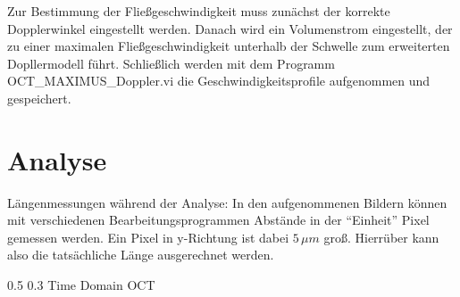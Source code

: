 \documentclass[german, %
parskip=full, %
bibliography=totoc, %
]{scrartcl}
\makeatletter
\renewcommand\subsection{\@startsection 
   {subsection}{2}{0mm}%
   {0.5\baselineskip}%
   {0.3\baselineskip}%
   {\bfseries\sffamily\large}%
   }
\makeatother
\begin{document}
Zur Bestimmung der Fließgeschwindigkeit muss zunächst der korrekte Dopplerwinkel eingestellt werden. Danach wird ein Volumenstrom eingestellt, der zu einer maximalen Fließgeschwindigkeit unterhalb der Schwelle zum erweiterten Dopllermodell führt. Schließlich werden mit dem Programm OCT\_MAXIMUS\_Doppler.vi die Geschwindigkeitsprofile aufgenommen und gespeichert. 

\section{Analyse}

Längenmessungen während der Analyse: In den aufgenommenen Bildern können mit verschiedenen Bearbeitungsprogrammen Abstände in der "`Einheit"' Pixel gemessen werden. Ein Pixel in y-Richtung ist dabei $5\, \mu m$ groß. Hierrüber kann also die tatsächliche Länge ausgerechnet werden.

\subsection{Time Domain OCT}
\end{document}
